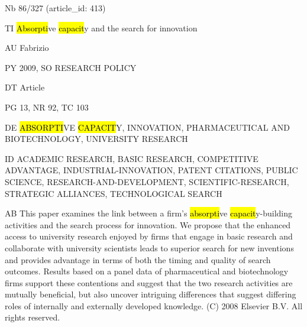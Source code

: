 \documentclass[a4paper]{article}
\begin{document}
\vspace*{-2cm}
Nb \tabto{0cm}86/327 (article\_id: 413)\par
TI \tabto{0cm}\hl{Absorpti}ve \hl{capacit}y and the search for innovation\par
AU \tabto{0cm}Fabrizio\par
PY \tabto{0cm}2009, SO RESEARCH POLICY\par
DT \tabto{0cm}Article\par
PG \tabto{0cm}13, NR 92, TC 103\par
DE \tabto{0cm}\hl{ABSORPTI}VE \hl{CAPACIT}Y, INNOVATION, PHARMACEUTICAL AND BIOTECHNOLOGY, UNIVERSITY RESEARCH\par
ID \tabto{0cm}ACADEMIC RESEARCH, BASIC RESEARCH, COMPETITIVE ADVANTAGE, INDUSTRIAL-INNOVATION, PATENT CITATIONS, PUBLIC SCIENCE, RESEARCH-AND-DEVELOPMENT, SCIENTIFIC-RESEARCH, STRATEGIC ALLIANCES, TECHNOLOGICAL SEARCH\par
AB \tabto{0cm}This paper examines the link between a firm's \hl{absorpti}ve \hl{capacit}y-building activities and the search process for innovation. We propose that the enhanced access to university research enjoyed by firms that engage in basic research and collaborate with university scientists leads to superior search for new inventions and provides advantage in terms of both the timing and quality of search outcomes. Results based on a panel data of pharmaceutical and biotechnology firms support these contentions and suggest that the two research activities are mutually beneficial, but also uncover intriguing differences that suggest differing roles of internally and externally developed knowledge. (C) 2008 Elsevier B.V. All rights reserved.\par
\clearpage
\end{document}
